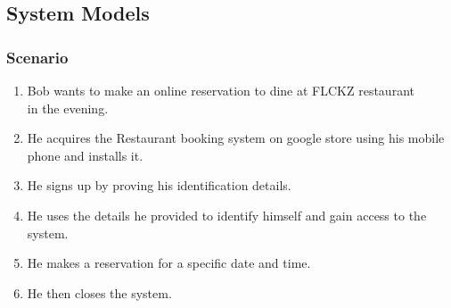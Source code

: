 \documentclass[15, notitlepage]{article}
\begin{document}
\subsection{System Models}
\subsubsection{Scenario}
\begin{enumerate}
	\item Bob wants to make an online reservation to dine at FLCKZ restaurant\\in the evening.
	\item He acquires the Restaurant booking system on google store using his mobile phone and installs it.\\
	\item He signs up by proving his identification details.
	\item He uses the details he provided to identify himself and gain access to the system.
	\item He makes a reservation for a specific date and time.
	\item He then closes the system.
\end{enumerate}
\end{document}
